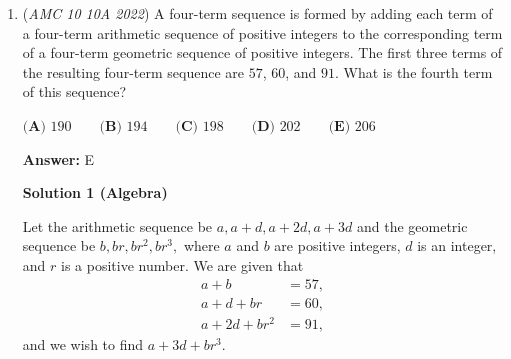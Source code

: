 \begin{enumerate}
 



\textbf{Solution 3}

Using Wolstenholmes' Theorem, we can rewrite $1 + \frac{1}{2} \dots + \frac{1}{16}$ as $\frac{17^2 n}{(17 - 1)!} = \frac{17^2 n}{16!}$ (for some $n \in \mathbb{Z}$). Adding the $\frac{1}{17}$ to $\frac{17^2 n}{16!}$, we get $\frac{17^3 n + 16!}{17!}$. 

 Now we have $\frac{17^3 n + 16!}{17!} = \frac{h}{L_{17}}$ and we want $h \pmod{17}$. We find that $\frac{L_{17}(17^3 n + 16!)}{17!} = \frac{L_{16}(17^3 n + 16!)}{16!} = h$. Taking $\pmod{17}$ and multiplying, we get $L_{16}(17^3 n + 16!) \equiv 16! \cdot h \pmod{17}$.

 Applying Wilson's Theorem on $16!$ and reducing, we simplify the congruence to $L_{16}(0 - 1) \equiv -L_{16} \equiv -h \pmod{17}$. Now we proceed with Solution 1 and find that $L_{16} \equiv 5 \pmod{17}$, so our answer is $\boxed{\textbf{(C) }5}$.  

 



\textbf{Solution 4}

We find that the numerator of the fraction or $h$ will be equal to $0+0+0+0+0...+L_{16} (\mod L_{17})$. This means we must find the remainder of $\frac{L_{16}}{17}$. We see that $L_{16}$ is $16*9*5*7*11*13=1*8*12*10*6*4 (\mod 17)$. We multiply this out and simplify to get $2 * 11=22=5 (\mod 17)$. So our answer is $\boxed{5}$.~jamespudi

 


	\item (\textit{AMC 10 10A 2022}) A four-term sequence is formed by adding each term of a four-term arithmetic sequence of positive integers to the corresponding term of a four-term geometric sequence of positive integers. The first three terms of the resulting four-term sequence are $57$, $60$, and $91$. What is the fourth term of this sequence? 


 $\textbf{(A) } 190 \qquad \textbf{(B) } 194 \qquad \textbf{(C) } 198 \qquad \textbf{(D) } 202 \qquad \textbf{(E) } 206$

 \textbf{Answer: }E



\textbf{Solution 1 (Algebra)}

Let the arithmetic sequence be $a,a+d,a+2d,a+3d$ and the geometric sequence be $b,br,br^2,br^3,$ where $a$ and $b$ are positive integers, $d$ is an integer, and $r$ is a positive number. We are given that
 \begin{align*} a+b&=57, \\ a+d+br&=60, \\ a+2d+br^2&=91, \end{align*}
and we wish to find $a+3d+br^3.$


\end{enumerate}
